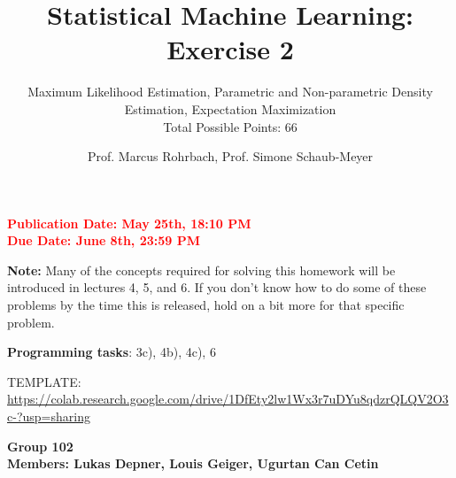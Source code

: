 \documentclass[
	english,
        solution=true
	]{tudaexercise}
\begin{document}
\author{Prof. Marcus Rohrbach, Prof. Simone Schaub-Meyer}
\title[Statistical Machine Learning Exercise 2]{\LARGE Statistical Machine Learning: Exercise 2}
\subtitle{Maximum Likelihood Estimation, Parametric and Non-parametric Density Estimation, Expectation Maximization \\ Total Possible Points: 66}
\maketitle

\textcolor{red}{\textbf{Publication Date: May 25th, 18:10 PM}}\\
\textcolor{red}{\textbf{Due Date: June 8th, 23:59 PM}}

\textbf{Note:} Many of the concepts required for solving this homework will be
introduced in lectures 4, 5, and 6. If you don't know how to do some of these
problems by the time this is released, hold on a bit more for that specific problem.

\textbf{Programming tasks}: 3c), 4b), 4c), 6

TEMPLATE: \url{https://colab.research.google.com/drive/1DfEty2lw1Wx3r7uDYu8qdzrQLQV2O3c-?usp=sharing}

\textbf{Group 102}\\
\textbf{Members: Lukas Depner, Louis Geiger, Ugurtan Can Cetin} 
\end{document}

